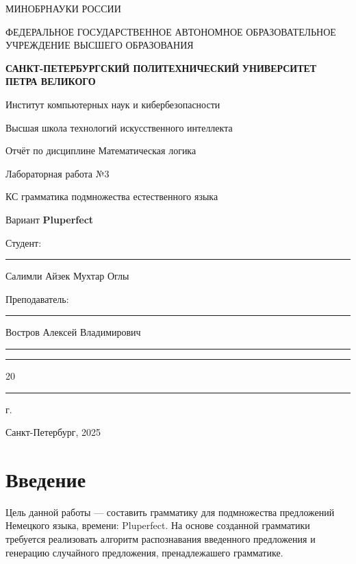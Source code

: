 \documentclass[areasetadvanced]{scrartcl}
\begin{document}
\sloppy
	\thispagestyle{empty}
	\begin{center}
		\large{МИНОБРНАУКИ РОССИИ} \par
		\vspace{0.3cm}
		\normalsize
		{ФЕДЕРАЛЬНОЕ ГОСУДАРСТВЕННОЕ АВТОНОМНОЕ ОБРАЗОВАТЕЛЬНОЕ УЧРЕЖДЕНИЕ ВЫСШЕГО ОБРАЗОВАНИЯ} \par
		\vspace{0.3cm}
		\textbf{\guillemotleft САНКТ-ПЕТЕРБУРГСКИЙ ПОЛИТЕХНИЧЕСКИЙ}
		\textbf{УНИВЕРСИТЕТ ПЕТРА ВЕЛИКОГО\guillemotright} \par
		\vspace{0.3cm}
		{Институт компьютерных наук и кибербезопасности}\par
		{Высшая школа технологий искусственного интеллекта}\par
	\end{center}
	\vfill
	\begin{center}
		{\large Отчёт по дисциплине \guillemotleft Математическая логика\guillemotright}\par
		{\huge   Лабораторная работа №3
		
		\guillemotleft КС грамматика подмножества естественного языка\guillemotright}\par
            {\huge Вариант \textbf{Pluperfect}}
         
	\end{center}
	\vfill
	\begin{flushleft}
		Студент: \hspace{1.8cm} \rule[0pt]{2.5cm}{0.5pt}\hfill Салимли Айзек Мухтар Оглы\par
		\vspace{1.5cm}
		Преподаватель: \hspace{0.55cm} \rule[0pt]{2.5cm}{0.5pt}\hfill  Востров Алексей Владимирович
	\end{flushleft}
	\vspace{0.5cm}
	\begin{flushright}
		\guillemotleft \rule[0pt]{0.8cm}{0.5pt}\guillemotright \rule[0pt]{2cm}{0.5pt} 20\rule[0pt]{0.5cm}{0.5pt} г.
	\end{flushright}
	\vfill
	\begin{center}
		Санкт-Петербург, 2025
	\end{center}
	\newpage
	\tableofcontents
	\newpage
\section*{Введение}
	Цель данной работы — составить грамматику для подмножества предложений Немецкого языка, времени: Pluperfect. На основе созданной грамматики требуется реализовать алгоритм распознавания введенного предложения и генерацию случайного предложения, пренадлежашего грамматике.
\end{document}
